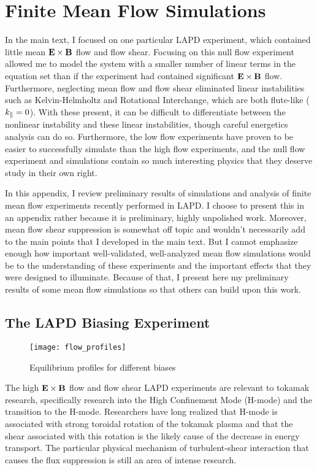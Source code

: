 \chapter{Finite Mean Flow Simulations}
\label{app_mean_flow}

In the main text, I focused on one particular LAPD experiment, which contained little mean ${\bf E \times B}$ flow and flow shear. Focusing on this null flow experiment
allowed me to model the system with a smaller number of linear terms in the equation set than if the experiment had contained significant ${\bf E \times B}$ flow. 
Furthermore, neglecting mean flow and flow shear eliminated linear instabilities such as Kelvin-Helmholtz
and Rotational Interchange, which are both flute-like ($k_{\parallel} = 0$). With these present, it can be difficult to differentiate between the nonlinear instability and these linear instabilities,
though careful energetics analysis can do so.
Furthermore, the low flow experiments have proven to be easier to successfully simulate than
the high flow experiments, and the null flow experiment and simulations contain so much interesting physics that they deserve study in their own right.

In this appendix, I review preliminary results of simulations and analysis of finite mean flow experiments recently performed in LAPD. 
I choose to present this in an appendix rather because it is preliminary, highly unpolished work. 
Moreover, mean flow shear suppression is somewhat off topic and wouldn't necessarily add to the main points that I developed in the main text. 
But I cannot emphasize enough how important well-validated, well-analyzed mean flow simulations would be
to the understanding of these experiments and the important effects that they were designed to illuminate. Because of that, I present here my preliminary results of some mean flow simulations
so that others can build upon this work.


\section{The LAPD Biasing Experiment}
\label{s_biasing_exp}

\begin{figure}
\centerline{\texttt{[image: flow\_profiles]}}
\caption{Equilibrium profiles for different biases}
\label{flow_profiles}
\end{figure}

The high ${\bf E \times B}$ flow and flow shear LAPD experiments are relevant to tokamak research, specifically research into the High Confinement Mode (H-mode)
and the transition to the H-mode. Researchers have long realized that H-mode is associated with strong toroidal rotation of the tokamak plasma and that the shear associated with this rotation
is the likely cause of the decrease in energy transport. The particular physical mechanism of turbulent-shear interaction that causes the flux suppression is still an area of intense research.

